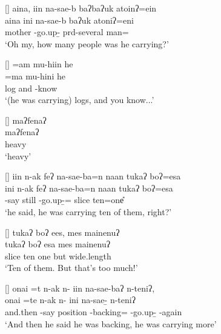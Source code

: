 \begin{exe}
{\begin{xlist}
	
\end{xlist}}

[]{\glll
	aina, iin na-sae-b baʔ{\tl}baʔuk atoinʔ=ein\\
	aina ini na-sae-b {\prd}baʔuk atoniʔ=eni \\
	mother {\iin} \na-go.up-{\b} prd-several man={\ein} \\
\glt `Oh my, how many people was he carrying?'}

[]{\glll
	 =am mu-hiin he \\
	 =ma mu-hini he \\
	log and \mu-know {\he} \\
\glt `(he was carrying) logs, and you know...'}

[]{\glll
	maʔfenaʔ \\
	maʔfenaʔ \\
	heavy \\
\glt `heavy'}

[]{\glll
	iin n-ak feʔ na-sae-ba=n naan tukaʔ boʔ=esa\\
	ini n-ak feʔ na-sae-ba=n naan tukaʔ boʔ=esa \\
	{\iin} \n-say still \nat-go.up-{\b}={\einV} {\naan} slice ten=one{\U} \\
\glt `he said, he was carrying ten of them, right?'}

[]{\glll
	tukaʔ boʔ ees, mes mainenuʔ\\
	tukaʔ boʔ esa mes mainenuʔ\\
	slice ten one but wide.length\\
\glt `Ten of them. But that's too much!'}

[]{\glll
	{onai =t} n-ak  n- iin na-sae-baʔ n-teniʔ, \\
	{onai =te} n-ak  n- ini na-sae-{\b} n-teniʔ \\
	and.then \n-say position \n-backing={\ii} {\iin} \nat-go.up-{\b} \n-again \\
\glt `And then he said he was backing, he was carrying more'}


\end{exe}
